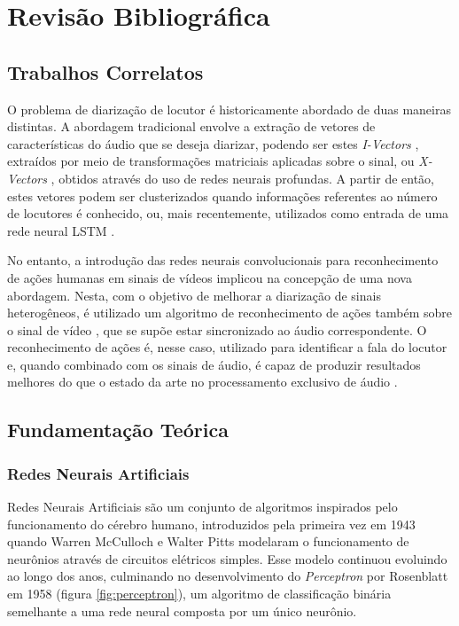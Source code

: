 \chapter{Revisão Bibliográfica}

\section{Trabalhos Correlatos}
\label{sec:related-work}

O problema de diarização de locutor é historicamente abordado de duas maneiras distintas.
A abordagem tradicional envolve a extração de vetores de características do áudio que se deseja diarizar, podendo ser estes \textit{I-Vectors} \cite{dehakFrontEndFactorAnalysis2011}, extraídos por meio de transformações matriciais aplicadas sobre o sinal, ou \textit{X-Vectors} \cite{snyderXVectorsRobustDNN2018}, obtidos através do uso de redes neurais profundas.
A partir de então, estes vetores podem ser clusterizados \cite{sellSpeakerDiarizationPlda2014} quando informações referentes ao número de locutores é conhecido, ou, mais recentemente, utilizados como entrada de uma rede neural LSTM \cite{wangSpeakerDiarizationLSTM2018}.

No entanto, a introdução das redes neurais convolucionais para reconhecimento de ações humanas em sinais de vídeos \cite{ji3DConvolutionalNeural2013, karpathyLargeScaleVideoClassification2014} implicou na concepção de uma nova abordagem.
Nesta, com o objetivo de melhorar a diarização de sinais heterogêneos, é utilizado um algoritmo de reconhecimento de ações também sobre o sinal de vídeo \cite{hersheyAudiovisualGraphicalModels2004}, que se supõe estar sincronizado ao áudio correspondente.
O reconhecimento de ações é, nesse caso, utilizado para identificar a fala do locutor e, quando combinado com os sinais de áudio, é capaz de produzir resultados melhores do que o estado da arte no processamento exclusivo de áudio \cite{ephratLookingListenCocktail2018}.

\section{Fundamentação Teórica}

\subsection{Redes Neurais Artificiais}
\label{sec:ann}

Redes Neurais Artificiais são um conjunto de algoritmos inspirados pelo funcionamento do cérebro humano, introduzidos pela primeira vez em 1943 quando Warren McCulloch e Walter Pitts modelaram o funcionamento de neurônios através de circuitos elétricos simples\cite{mccullochLogicalCalculusIdeas1943}. 
Esse modelo continuou evoluindo ao longo dos anos, culminando no desenvolvimento do \textit{Perceptron} por Rosenblatt em 1958 \cite{rosenblattPerceptronProbabilisticModel1958} (figura \ref{fig:perceptron}), um algoritmo de classificação binária semelhante a uma rede neural composta por um único neurônio.

